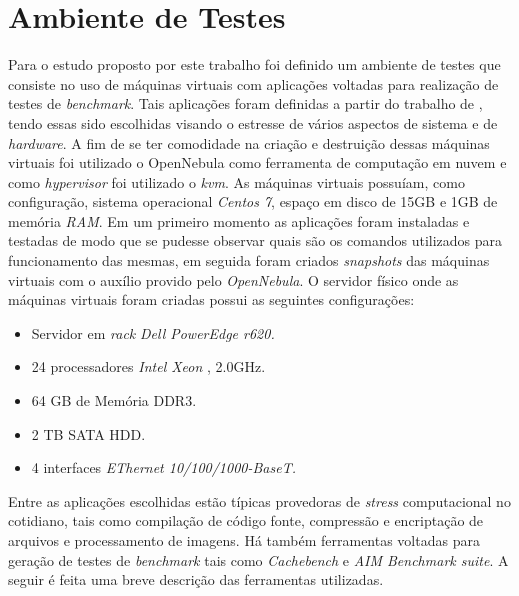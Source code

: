 \documentclass[[10pt,journal]{IEEEtran}
\begin{document}
\section{Ambiente de Testes}\label{sec:ambiente_teste}

Para o estudo proposto por este trabalho foi definido um  ambiente de testes que consiste no uso de máquinas virtuais com aplicações voltadas para realização
de testes de \textit{benchmark}. Tais aplicações foram definidas a partir do trabalho de \cite{koh2007}, tendo essas sido escolhidas visando o estresse de vários aspectos de sistema e de \textit{hardware}. A fim de se ter comodidade na criação e destruição dessas máquinas virtuais foi utilizado o OpenNebula como ferramenta de computação em nuvem e como \textit{hypervisor} foi utilizado o \textit{kvm}. As máquinas virtuais possuíam, como configuração, sistema operacional \textit{Centos 7}, espaço em disco de 15GB e 1GB de memória \textit{RAM}. Em um primeiro momento as aplicações foram instaladas e testadas de modo que se pudesse observar quais são os comandos utilizados para funcionamento das mesmas, em seguida foram criados \textit{snapshots} das máquinas virtuais com o auxílio provido pelo \textit{OpenNebula}. O servidor físico onde as máquinas virtuais foram criadas possui as seguintes configurações:
\begin{itemize}
	\item Servidor em \textit{rack} \textit{Dell PowerEdge r620.}
	\item 24 processadores \textit{Intel Xeon }, 2.0GHz.
	\item 64 GB de Memória DDR3.
	\item 2 TB SATA HDD.
	\item 4 interfaces \textit{EThernet 10/100/1000-BaseT.}
\end{itemize} 

Entre as aplicações escolhidas estão típicas provedoras de \textit{stress} computacional no cotidiano, tais como compilação de código fonte, compressão e encriptação de arquivos e processamento de imagens. Há também ferramentas voltadas para geração de testes de \textit{benchmark} tais como \textit{Cachebench} e \textit{AIM Benchmark suite}. A seguir é feita uma breve descrição das ferramentas utilizadas.
\end{document}
